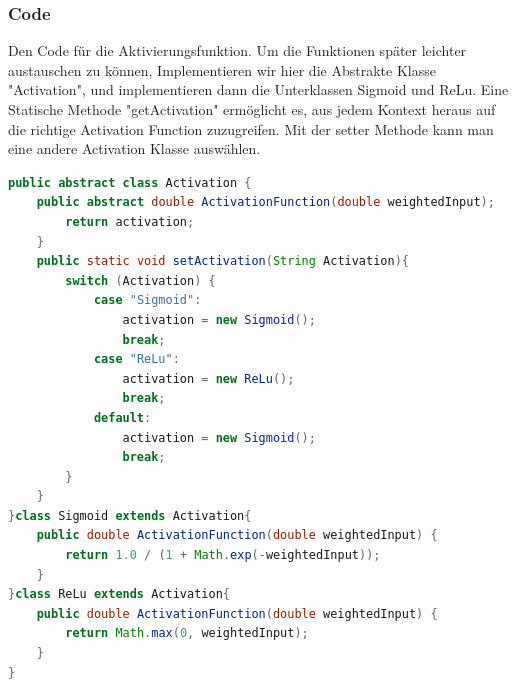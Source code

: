 \documentclass[12pt]{article}
\begin{document}
\subsubsection{Code}Den Code für die Aktivierungsfunktion. Um die Funktionen später leichter austauschen zu können, Implementieren wir hier die Abstrakte Klasse "Activation", und implementieren dann die Unterklassen Sigmoid und ReLu. Eine Statische Methode "getActivation" ermöglicht es, aus jedem Kontext heraus auf die richtige Activation Function zuzugreifen. Mit der setter Methode kann man eine andere Activation Klasse auswählen.\begin{lstlisting}[language=Java]
public abstract class Activation {
    public abstract double ActivationFunction(double weightedInput);    static Activation activation = new Sigmoid();    public static Activation geActivation(){
        return activation;
    }
    public static void setActivation(String Activation){
        switch (Activation) {
            case "Sigmoid":
                activation = new Sigmoid();
                break;
            case "ReLu":
                activation = new ReLu();
                break;
            default:
                activation = new Sigmoid();
                break;
        }
    }
}class Sigmoid extends Activation{
    public double ActivationFunction(double weightedInput) {
        return 1.0 / (1 + Math.exp(-weightedInput));
    }
}class ReLu extends Activation{
    public double ActivationFunction(double weightedInput) {
        return Math.max(0, weightedInput);
    }
}
\end{lstlisting}
\end{document}
